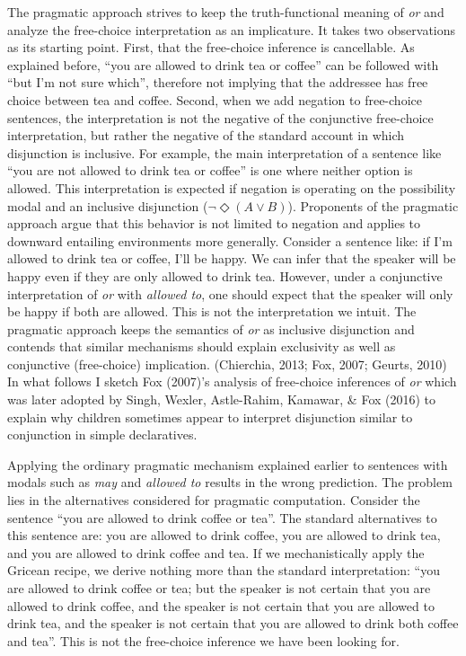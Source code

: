 \documentclass[oneside]{report}
\theoremstyle{definition}
\theoremstyle{definition}
\theoremstyle{definition}
\theoremstyle{remark}
\begin{document}
The pragmatic approach strives to keep the truth-functional meaning of
\emph{or} and analyze the free-choice interpretation as an implicature.
It takes two observations as its starting point. First, that the
free-choice inference is cancellable. As explained before, ``you are
allowed to drink tea or coffee'' can be followed with ``but I'm not sure
which'', therefore not implying that the addressee has free choice
between tea and coffee. Second, when we add negation to free-choice
sentences, the interpretation is not the negative of the conjunctive
free-choice interpretation, but rather the negative of the standard
account in which disjunction is inclusive. For example, the main
interpretation of a sentence like ``you are not allowed to drink tea or
coffee'' is one where neither option is allowed. This interpretation is
expected if negation is operating on the possibility modal and an
inclusive disjunction (\(\lnot \Diamond (A \lor B)\)). Proponents of the
pragmatic approach argue that this behavior is not limited to negation
and applies to downward entailing environments more generally. Consider
a sentence like: if I'm allowed to drink tea or coffee, I'll be happy.
We can infer that the speaker will be happy even if they are only
allowed to drink tea. However, under a conjunctive interpretation of
\emph{or} with \emph{allowed to}, one should expect that the speaker
will only be happy if both are allowed. This is not the interpretation
we intuit. The pragmatic approach keeps the semantics of \emph{or} as
inclusive disjunction and contends that similar mechanisms should
explain exclusivity as well as conjunctive (free-choice) implication.
(Chierchia, 2013; Fox, 2007; Geurts, 2010) In what follows I sketch Fox
(2007)'s analysis of free-choice inferences of \emph{or} which was later
adopted by Singh, Wexler, Astle-Rahim, Kamawar, \& Fox (2016) to explain
why children sometimes appear to interpret disjunction similar to
conjunction in simple declaratives.

Applying the ordinary pragmatic mechanism explained earlier to sentences
with modals such as \emph{may} and \emph{allowed to} results in the
wrong prediction. The problem lies in the alternatives considered for
pragmatic computation. Consider the sentence ``you are allowed to drink
coffee or tea''. The standard alternatives to this sentence are: you are
allowed to drink coffee, you are allowed to drink tea, and you are
allowed to drink coffee and tea. If we mechanistically apply the Gricean
recipe, we derive nothing more than the standard interpretation: ``you
are allowed to drink coffee or tea; but the speaker is not certain that
you are allowed to drink coffee, and the speaker is not certain that you
are allowed to drink tea, and the speaker is not certain that you are
allowed to drink both coffee and tea''. This is not the free-choice
inference we have been looking for.
\end{document}
